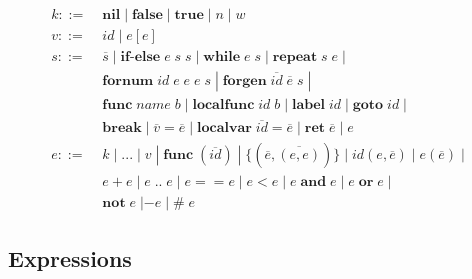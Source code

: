 \documentclass[12pt]{article}
\newcommand{\pipe}{\;|\;}
\begin{document}
\begin{align*}
k ::= \; & \mathbf{nil} \pipe \mathbf{false} \pipe \mathbf{true}
\pipe n \pipe w\\ 
v ::= \; & id \pipe e[e]\\
s ::= \; & \overline{s} \pipe \textbf{if-else} \; e \; s \; s
\pipe \textbf{while} \; e \; s \pipe \textbf{repeat} \; s \; e \pipe\\
& \textbf{fornum} \; id \; e \; e \; e \; s 
\pipe \textbf{forgen} \; \overline{id} \; \overline{e} \; s \pipe\\
& \textbf{func} \; name \; b \pipe \textbf{localfunc} \; id \; b
\pipe \textbf{label} \; id \pipe \textbf{goto} \; id \pipe\\
& \textbf{break} \pipe \overline{v} = \overline{e}
\pipe \textbf{localvar} \; \overline{id} = \overline{e}
\pipe \textbf{ret} \; \overline{e} \pipe e\\
e ::= \; & k \pipe {...} \pipe v \pipe \mathbf{func} \; (\overline{id})
\pipe \{(\overline{e},\overline{(e,e)})\}
\pipe id(e,\overline{e}) \pipe e(\overline{e}) \pipe\\
& e + e \pipe e \; {..} \; e \pipe e == e \pipe e < e
\pipe e \; \mathbf{and} \; e \pipe e \; \mathbf{or} \; e \pipe\\
& \mathbf{not} \; e \; | - e \pipe \# \; e
\end{align*}

\subsection{Expressions}
\end{document}
